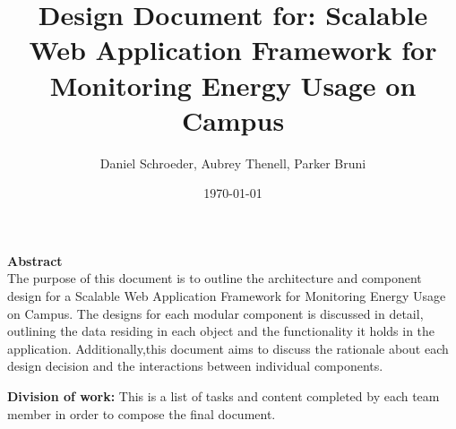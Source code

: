 \documentclass[journal,10pt,onecolumn,compsoc]{IEEEtran}
\title{Design Document for: \linebreak Scalable Web Application Framework for Monitoring Energy Usage on Campus}
\author{Daniel Schroeder, Aubrey Thenell, Parker Bruni}
\date{\today}
\begin{document}
    \maketitle
    \vspace{2cm}
    \begin{center}
    \noindent \textbf{Abstract} \\
                \indent The purpose of this document is to outline the architecture and component design for a Scalable Web Application Framework for Monitoring Energy Usage on Campus. The designs for each modular component is discussed in detail, outlining the data residing in each object and the functionality it holds in the application. Additionally,this document aims to discuss the rationale about each design decision and the interactions between individual components. 
    \end{center}         
    
    \newpage
    \tableofcontents
    \newpage
       \noindent\textbf{Division of work:}
       \noindent This is a list of tasks and content completed by each team member in order to compose the final document.
       
\end{document}
